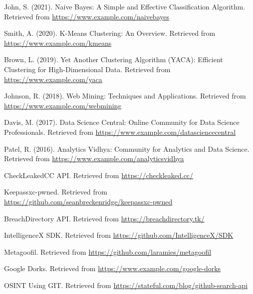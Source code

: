 \documentclass[openany]{report}
\begin{document}
\clearpage
\begin{thebibliography}{10}

    John, S. (2021). Naive Bayes: A Simple and Effective Classification Algorithm. Retrieved from \url{https://www.example.com/naivebayes}

    Smith, A. (2020). K-Means Clustering: An Overview. Retrieved from \url{https://www.example.com/kmeans}

    Brown, L. (2019). Yet Another Clustering Algorithm (YACA): Efficient Clustering for High-Dimensional Data. Retrieved from \url{https://www.example.com/yaca}

    Johnson, R. (2018). Web Mining: Techniques and Applications. Retrieved from \url{https://www.example.com/webmining}

    Davis, M. (2017). Data Science Central: Online Community for Data Science Professionals. Retrieved from \url{https://www.example.com/datasciencecentral}

    Patel, R. (2016). Analytics Vidhya: Community for Analytics and Data Science. Retrieved from \url{https://www.example.com/analyticsvidhya}

    CheckLeakedCC API. Retrieved from \url{https://checkleaked.cc/}

    Keepassxc-pwned. Retrieved from \url{https://github.com/seanbreckenridge/keepassxc-pwned}

    BreachDirectory API. Retrieved from \url{https://breachdirectory.tk/}

    IntelligenceX SDK. Retrieved from \url{https://github.com/IntelligenceX/SDK}

    Metagoofil. Retrieved from \url{https://github.com/laramies/metagoofil}

    Google Dorks. Retrieved from \url{https://www.example.com/google-dorks}

    OSINT Using GIT. Retrieved from \url{https://stateful.com/blog/github-search-api}

\end{thebibliography}
\end{document}
